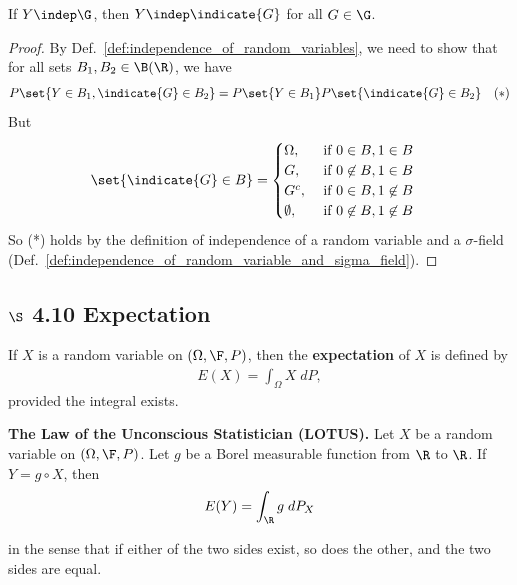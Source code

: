 \documentclass{article} %
\begin{document}
\begin{proposition}
If $Y \indep \G$, then $Y \indep \indicate{G}$ \; for all $G \in \G$.
\label{prop:a_random_variable_is_independent_from_an_indicator_for_any_set_belonging_to_a_sigma_field_that_is_independent_from_the_random_variable}
\end{proposition}

\begin{proof}
By Def.~\ref{def:independence_of_random_variables}, we need to show that for all sets $B_1, B_2 \in \B(\R)$, we have 
\begin{align*}
P\set{Y \in B_1, \indicate{G} \in B_2} = P\set{Y \in B_1} P\set{\indicate{G} \in B_2} && (*)
\end{align*}	
But
\begin{align*}
\set{\indicate{G} \in B} &= 
\begin{cases}
\Omega, & \text{ if } 0 \in B, 1 \in B \\	
G, & \text{ if } 0 \not\in B, 1 \in B \\	
G^c, & \text{ if } 0 \in B, 1 \not\in B \\	
\emptyset, & \text{ if } 0 \not\in B, 1 \not\in B 
\end{cases}
\end{align*}
So (*) holds by the definition of independence of a random variable and a $\sigma$-field (Def.~\ref{def:independence_of_random_variable_and_sigma_field}).
\end{proof}


\subsection{$\S$ 4.10 Expectation}

\begin{definition}
If $X$ is a random variable on $(\Omega, \F, P)$, then the \textbf{expectation} of $X$ is defined by
\begin{align}
E(X) = \int_\Omega X \; dP,
\label{eqn:def_expectation}
\end{align}
provided the integral exists.
\label{def:expectation}
\end{definition}

\begin{theorem}{\textbf{The Law of the Unconscious Statistician (LOTUS).}}
Let $X$ be a random variable on $(\Omega, \F, P)$.  Let $g$ be a Borel measurable function from $\R$ to $\R$.  If $Y = g \circ X$, then 
\begin{align}
 E(Y) = \int_\R g \; dP_X
\label{eqn:expectation_as_integral_wrt_induced_probability_measure}	
\end{align}

in the sense that if either of the two sides exist, so does the other, and the two sides are equal.
\label{thm:LOTUS}	
\end{theorem}
\end{document}
